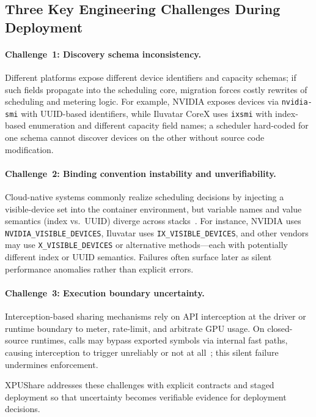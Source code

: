 \documentclass[runningheads,a4paper]{llncs}
\begin{document}
\subsection{Three Key Engineering Challenges During Deployment}

\paragraph{Challenge~1: Discovery schema inconsistency.}
Different platforms expose different device identifiers and capacity
schemas; if such fields propagate into the scheduling core, migration
forces costly rewrites of scheduling and metering logic. For example,
NVIDIA exposes devices via \texttt{nvidia-smi} with UUID-based
identifiers, while Iluvatar CoreX uses \texttt{ixsmi} with index-based
enumeration and different capacity field names; a scheduler hard-coded
for one schema cannot discover devices on the other without source code modification.

\paragraph{Challenge~2: Binding convention instability and
unverifiability.}
Cloud-native systems commonly realize scheduling decisions by injecting a
visible-device set into the container environment, but variable names and
value semantics (index vs.\ UUID) diverge across
stacks~\cite{biren-plugin,cdi,deepspark-toolkit,metax-vllm,moorethreads-musa,paddleocr-metax}.
For instance, NVIDIA uses \texttt{NVIDIA\_VISIBLE\_DEVICES}, Iluvatar
uses \texttt{IX\_VISIBLE\_DEVICES}, and other vendors may use \texttt{X\_VISIBLE\_DEVICES} or alternative methods---each with potentially different index or UUID semantics. Failures often surface later as silent performance
anomalies rather than explicit errors.

\paragraph{Challenge~3: Execution boundary uncertainty.}
Interception-based sharing mechanisms rely on API interception at the
driver or runtime boundary to meter, rate-limit, and arbitrate GPU usage.
On closed-source runtimes, calls may bypass exported symbols via internal
fast paths, causing interception to trigger unreliably or not at
all~\cite{cuda-interception}; this silent failure undermines enforcement.

XPUShare addresses these challenges with explicit contracts and staged
deployment so that uncertainty becomes verifiable evidence for deployment
decisions.
\end{document}
